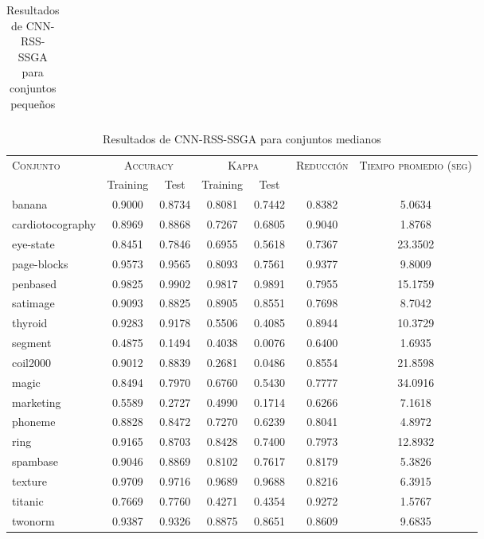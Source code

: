 \begin{table}[]
\begin{tabular}{l c c c c c c}
\hline
\end{tabular}
\caption{Resultados de CNN-RSS-SSGA para conjuntos pequeños }
\label{res-peq-CNN-RSS-ssga}
\end{table}


\begin{table}[]
\centering
\begin{tabular}{l c c c c c c}
\hline
\multirow{2}{*}{\textsc{Conjunto}}
	& \multicolumn{2}{c}{\textsc{Accuracy}}
	& \multicolumn{2}{c}{\textsc{Kappa}}
	& \textsc{Reducción}
	& \textsc{Tiempo promedio (seg)} \\
	& Training & Test
	& Training & Test \\ 
\hline
\hline

banana & 0.9000 & 0.8734 & 0.8081 & 0.7442 & 0.8382 & 5.0634 \\
cardiotocography & 0.8969 & 0.8868 & 0.7267 & 0.6805 & 0.9040 & 1.8768 \\
eye-state & 0.8451 & 0.7846 & 0.6955 & 0.5618 & 0.7367 &  23.3502 \\
page-blocks & 0.9573 & 0.9565 & 0.8093 & 0.7561 & 0.9377 & 9.8009 \\
penbased & 0.9825 & 0.9902 & 0.9817 & 0.9891 & 0.7955 & 15.1759 \\
satimage & 0.9093 & 0.8825 & 0.8905 & 0.8551 & 0.7698 & 8.7042 \\
thyroid & 0.9283 & 0.9178 & 0.5506 & 0.4085 & 0.8944 & 10.3729 \\
segment & 0.4875 & 0.1494 & 0.4038 & 0.0076 & 0.6400 & 1.6935 \\
coil2000 & 0.9012 & 0.8839 & 0.2681 & 0.0486 & 0.8554 &  21.8598 \\
magic & 0.8494 & 0.7970 & 0.6760 & 0.5430 & 0.7777 &  34.0916 \\
marketing & 0.5589 & 0.2727 & 0.4990 & 0.1714 & 0.6266 & 7.1618 \\
phoneme & 0.8828 & 0.8472 & 0.7270 & 0.6239 & 0.8041 & 4.8972 \\
ring & 0.9165 & 0.8703 & 0.8428 & 0.7400 & 0.7973 & 12.8932 \\
spambase & 0.9046 & 0.8869 & 0.8102 & 0.7617 & 0.8179 & 5.3826 \\
texture & 0.9709 & 0.9716 & 0.9689 & 0.9688 & 0.8216 & 6.3915 \\
titanic & 0.7669 & 0.7760 & 0.4271 & 0.4354 & 0.9272 & 1.5767 \\
twonorm & 0.9387 & 0.9326 & 0.8875 & 0.8651 & 0.8609 & 9.6835 \\

\hline
\end{tabular}
\caption{Resultados de CNN-RSS-SSGA para conjuntos medianos }
\label{res-med-CNN-RSS-ssga}
\end{table}



